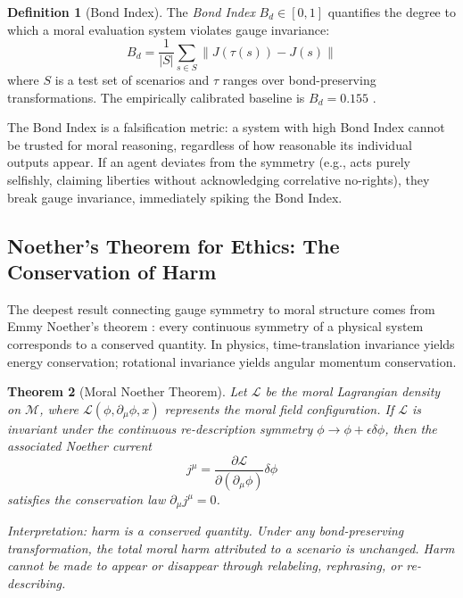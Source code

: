 \documentclass[12pt]{article}
\newtheorem{theorem}{Theorem}[section]
\theoremstyle{definition}
\newtheorem{definition}[theorem]{Definition}
\theoremstyle{remark}
\newcommand{\M}{\mathcal{M}}
\newcommand{\Lag}{\mathcal{L}}
\begin{document}
\begin{definition}[Bond Index]
The \emph{Bond Index} $B_d \in [0, 1]$ quantifies the degree to which a moral evaluation system violates gauge invariance:
\begin{equation}
B_d = \frac{1}{|S|} \sum_{s \in S} \| J(\tau(s)) - J(s) \|
\label{eq:bond_index}
\end{equation}
where $S$ is a test set of scenarios and $\tau$ ranges over bond-preserving transformations. The empirically calibrated baseline is $B_d = 0.155$ \citep{anon2026d}.
\end{definition}

The Bond Index is a falsification metric: a system with high Bond Index cannot be trusted for moral reasoning, regardless of how reasonable its individual outputs appear. If an agent deviates from the symmetry (e.g., acts purely selfishly, claiming liberties without acknowledging correlative no-rights), they break gauge invariance, immediately spiking the Bond Index.

\subsection{Noether's Theorem for Ethics: The Conservation of Harm}

The deepest result connecting gauge symmetry to moral structure comes from Emmy Noether's theorem \citep{noether1918}: every continuous symmetry of a physical system corresponds to a conserved quantity. In physics, time-translation invariance yields energy conservation; rotational invariance yields angular momentum conservation.

\begin{theorem}[Moral Noether Theorem]
\label{thm:noether}
Let $\Lag$ be the moral Lagrangian density on $\M$, where $\Lag(\phi, \partial_\mu \phi, x)$ represents the moral field configuration. If $\Lag$ is invariant under the continuous re-description symmetry $\phi \to \phi + \epsilon \delta\phi$, then the associated Noether current
\begin{equation}
j^\mu = \frac{\partial \Lag}{\partial (\partial_\mu \phi)} \delta\phi
\label{eq:noether_current}
\end{equation}
satisfies the conservation law $\partial_\mu j^\mu = 0$.

Interpretation: harm is a conserved quantity. Under any bond-preserving transformation, the total moral harm attributed to a scenario is unchanged. Harm cannot be made to appear or disappear through relabeling, rephrasing, or re-describing.
\end{theorem}
\end{document}
